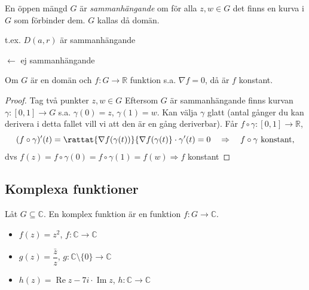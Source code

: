 \begin{definition}
En öppen mängd $G$ är \emph{sammanhängande} om för alla $z, w \in G$ det finns en kurva i $G$ som förbinder dem.
$G$ kallas då domän.
\end{definition}

\begin{example}
t.ex. $D(a, r)$ är sammanhängande

$\leftarrow$ ej sammanhängande
\end{example}

\begin{theorem}[(25 PB, ej i Adams)]
Om $G$ är en domän och $f : G \to \mathbb{R}$ funktion s.a. $\nabla f = 0$, då är $f$ konstant.
\end{theorem}
\begin{proof}
Tag två punkter $z, w \in G$
Eftersom $G$ är sammanhängande finns kurvan $\gamma : [0, 1] \to G$ s.a. $\gamma(0) = z$, $\gamma(1) = w$. Kan välja $\gamma$ glatt (antal gånger du kan derivera i detta fallet vill vi att den är en gång deriverbar). Får $f \circ \gamma : [0, 1] \to \mathbb{R}$,
\[ (f \circ \gamma)'(t) = \rattat{\nabla f(\gamma(t))}{\nabla f(\gamma(t)} \cdot \gamma'(t) = 0 \quad \Rightarrow \quad f \circ \gamma \text{ konstant,} \]
dvs $f(z) = f \circ \gamma(0) = f \circ \gamma(1) = f(w) \Rightarrow f$ konstant
\end{proof}

\subsection{Komplexa funktioner}
\begin{definition}
Låt $G \subseteq \mathbb{C}$. En komplex funktion är en funktion $f : G \to \mathbb{C}$.
\end{definition}

\begin{example}
\begin{itemize}
  \item $f(z) = z^2$, \quad $f : \mathbb{C} \to \mathbb{C}$
  \item $g(z) = \dfrac{\bar{z}}{z}$, \quad $g : \mathbb{C} \setminus \{0\} \to \mathbb{C}$
  \item $h(z) = \operatorname{Re} z - 7i \cdot \operatorname{Im} z$, \quad $h : \mathbb{C} \to \mathbb{C}$
\end{itemize}
\end{example}

